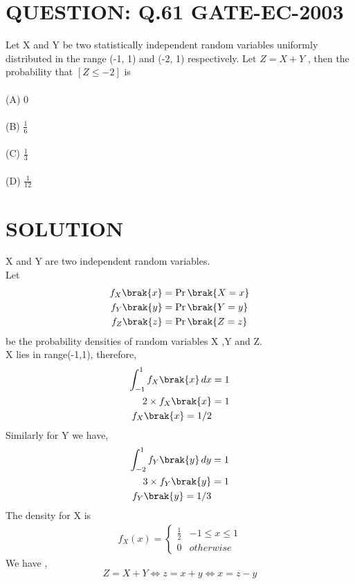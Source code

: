 \documentclass[journal,12pt,twocolumn]{IEEEtran}
\begin{document}
\section{QUESTION: Q.61 GATE-EC-2003}
Let X and Y be two statistically independent random variables uniformly distributed in the range (-1, 1) and (-2, 1) respectively. Let $Z = X +Y$ , then the probability that $[Z \leq -2]$ is\\
\\(A) 0\\
\\(B) $\frac{1}{6}$\\
\\(C) $\frac{1}{3}$\\
\\(D) $\frac{1}{12}$
\section{SOLUTION}
X and Y are two independent random variables. \\
Let
\begin{align}
    f_X\brak{x} &= \Pr\brak{X=x} \\
    f_Y\brak{y} &= \Pr\brak{Y=y}  \\
    f_Z\brak{z} &= \Pr\brak{Z=z}
\end{align}
be the probability densities of random variables X ,Y and Z. \\
X lies in range(-1,1), therefore,
\begin{align}
    \int_{-1}^{1} f_X\brak{x} \,dx  &=1 \\
    2 \times f_X\brak{x}  &= 1 \\
     f_X\brak{x} =1 /2
\end{align}
Similarly for Y we have,
\begin{align}
    \int_{-2}^{1} f_Y\brak{y} \,dy  &=1 \\
    3 \times f_Y\brak{y}  &= 1  \\
     f_Y\brak{y} =1 /3
\end{align}
The density for X is \\
\begin{align}
\label{eq:_pdf_x}
f_{X}(x)  = 
\begin{cases}
\frac{1}{2} & -1 \le x \le 1
\\
0 & otherwise
\end{cases}
\end{align}
We have ,
\begin{equation}
    Z= X+Y \iff z= x+ y \iff x = z-y
\end{equation}
\end{document}

